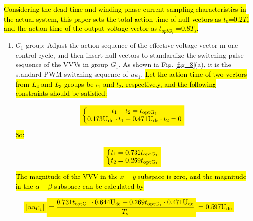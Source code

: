 \documentclass[sn-basic]{sn-jnl}
\newcommand{\mathcolorbox}[2]{\colorbox{#1}{$\displaystyle #2$}}
\theoremstyle{thmstyleone}%
\theoremstyle{thmstyletwo}%
\theoremstyle{thmstylethree}%
\theoremstyle{thmstyleone}%
\begin{document}
\hl{Considering the dead time and winding phase current sampling characteristics in the actual system, this paper sets the total action time of null vectors as $t_0$=0.2$T_s$ and the action time of the output voltage vector as $t_{{opt}{G_i}}$ =0.8$T_s$.}
\begin{enumerate}

    \item ${{G}_1}$ group: Adjust the action sequence of the effective voltage vector in one control cycle, and then insert null vectors to standardize the switching pulse sequence of the VVVs in group ${{G}_1}$. As shown in Fig. \ref{fig_8}(a), it is the standard PWM switching sequence of ${{uu}_1}$. \hl{Let the action time of two vectors from $L_4$ and $L_3$ groups be $t_1$ and $t_2$, respectively, and the following constraints should be satisfied:}



\begin{equation}
\mathcolorbox{yellow}{\left\{ \begin{matrix}
  {{t}_{1}}+{{t}_{2}}={{t}_{\mathrm{optG_1}}} \\
  0.173{{\text{U}}_{\text{dc}}}\cdot {{t}_{1}}-0.471{{\text{U}}_{\text{dc}}}\cdot {{t}_{2}}=0  \\
\end{matrix} \right.}
\end{equation}
\hl{So:}

\begin{equation}
\mathcolorbox{yellow}{\left\{ \begin{matrix}
 {{t}_{1}}=0.731{{t}_{\mathrm{optG_1}}} \\
 {{t}_{2}}=0.269{{t}_{\mathrm{optG_1}}} \\
\end{matrix} \right.}
\end{equation}
\hl{The magnitude of the VVV in the $x-y$ subspace is zero, and the magnitude in the $\alpha-\beta$ subspace can be calculated by}

\begin{equation}
\begin{aligned}
\mathcolorbox{yellow}{\left\vert{u}{u}_{G_1} \right\vert}\mathcolorbox{yellow}{=\frac{0.731 {t}_{\mathrm{optG_1}} \cdot 0.644 \mathrm{U}_{\mathrm{dc}}+0.269 {t}_{\mathrm{optG_1}} \cdot 0.471 \mathrm{U}_{\mathrm{dc}}}{T_{\mathrm{s}}} }
& \mathcolorbox{yellow}{=0.597 \mathrm{U}_{\mathrm{dc}}}
\end{aligned}
\end{equation}


\end{enumerate}
\end{document}
